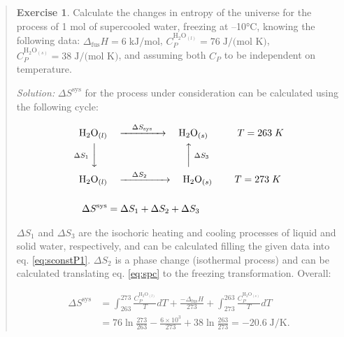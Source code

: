 \documentclass[
  9pt,
]{extbook}
\theoremstyle{definition}
\theoremstyle{definition}
\theoremstyle{definition}
\newtheorem{exercise}{Exercise}[chapter]
\theoremstyle{remark}
\begin{document}
\begin{quote}
\begin{exercise}
\protect\hypertarget{exr:supercooledEx}{}{\label{exr:supercooledEx} }Calculate the changes in entropy of the universe for the process of 1 mol of supercooled water, freezing at --10°C, knowing the following data: \(\Delta_{\mathrm{fus}}H = 6 \; \text{kJ/mol}\), \(C_P^{\mathrm{H}_2 \mathrm{O}_{(l)}}=76 \; \text{J/(mol K)}\), \(C_P^{\mathrm{H}_2 \mathrm{O}_{(s)}}=38 \; \text{J/(mol K)}\), and assuming both \(C_P\) to be independent on temperature.

\emph{Solution:} \(\Delta S^{\mathrm{sys}}\) for the process under consideration can be calculated using the following cycle:

\begin{equation}
\begin{aligned}
\mathrm{H}_2 \mathrm{O}_{(l)} & \quad \xrightarrow{\quad \Delta S_{\text{sys}} \quad} \quad \mathrm{H}_2 \mathrm{O}_{(s)} \qquad \quad T=263\;K\\
\scriptstyle{\Delta S_1} \; \bigg\downarrow \quad & \qquad \qquad \qquad \qquad \scriptstyle{\bigg\uparrow  \; \Delta S_3} \\
\mathrm{H}_2 \mathrm{O}_{(l)} & \quad \xrightarrow{\quad \Delta S_2 \qquad} \quad \mathrm{H}_2\mathrm{O}_{(s)} \qquad \; T=273\;K\\
\\
\Delta S^{\text{sys}} & = \Delta S_1 + \Delta S_2 + \Delta S_3
\end{aligned}
\label{eq:supercooledsyst}
\end{equation}

\(\Delta S_1\) and \(\Delta S_3\) are the isochoric heating and cooling processes of liquid and solid water, respectively, and can be calculated filling the given data into eq. \eqref{eq:sconstP1}. \(\Delta S_2\) is a phase change (isothermal process) and can be calculated translating eq. \eqref{eq:spc} to the freezing transformation. Overall:

\begin{equation}
\begin{aligned}
\Delta S^{\text{sys}} & = \int_{263}^{273} \frac{C_P^{\mathrm{H}_2 \mathrm{O}_{(l)}}}{T}dT+\frac{-\Delta_{\mathrm{fus}}H}{273}+\int_{273}^{263} \frac{C_P^{\mathrm{H}_2 \mathrm{O}_{(s)}}}{T}dT \\
& = 76 \ln \frac{273}{263} - \frac{6 \times 10^3}{273} + 38 \ln \frac{263}{273}= -20.6 \; \text{J/K}.
\end{aligned}
\label{eq:supercooledsyst2}
\end{equation}


\end{exercise}
\end{quote}
\end{document}
